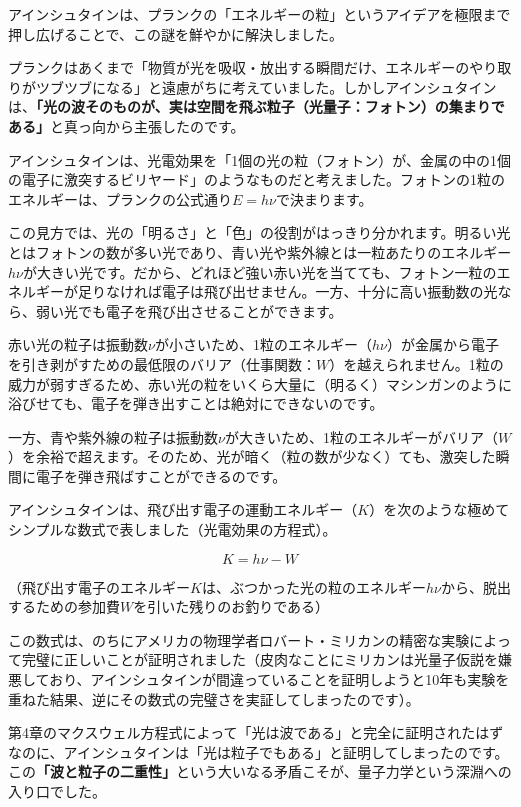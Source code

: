 アインシュタインは、プランクの「エネルギーの粒」というアイデアを極限まで押し広げることで、この謎を鮮やかに解決しました。

プランクはあくまで「物質が光を吸収・放出する瞬間だけ、エネルギーのやり取りがツブツブになる」と遠慮がちに考えていました。しかしアインシュタインは、\textbf{「光の波そのものが、実は空間を飛ぶ粒子（光量子：フォトン）の集まりである」}と真っ向から主張したのです。

アインシュタインは、光電効果を「1個の光の粒（フォトン）が、金属の中の1個の電子に激突するビリヤード」のようなものだと考えました。フォトンの1粒のエネルギーは、プランクの公式通り\(E = h\nu\)で決まります。

この見方では、光の「明るさ」と「色」の役割がはっきり分かれます。明るい光とはフォトンの数が多い光であり、青い光や紫外線とは一粒あたりのエネルギー\(h\nu\)が大きい光です。だから、どれほど強い赤い光を当てても、フォトン一粒のエネルギーが足りなければ電子は飛び出せません。一方、十分に高い振動数の光なら、弱い光でも電子を飛び出させることができます。

赤い光の粒子は振動数\(\nu\)が小さいため、1粒のエネルギー（\(h\nu\)）が金属から電子を引き剥がすための最低限のバリア（仕事関数：\(W\)）を越えられません。1粒の威力が弱すぎるため、赤い光の粒をいくら大量に（明るく）マシンガンのように浴びせても、電子を弾き出すことは絶対にできないのです。

一方、青や紫外線の粒子は振動数\(\nu\)が大きいため、1粒のエネルギーがバリア（\(W\)）を余裕で超えます。そのため、光が暗く（粒の数が少なく）ても、激突した瞬間に電子を弾き飛ばすことができるのです。

アインシュタインは、飛び出す電子の運動エネルギー（\(K\)）を次のような極めてシンプルな数式で表しました（光電効果の方程式）。

\[K = h\nu - W\]

（飛び出す電子のエネルギー\(K\)は、ぶつかった光の粒のエネルギー\(h\nu\)から、脱出するための参加費\(W\)を引いた残りのお釣りである）

この数式は、のちにアメリカの物理学者ロバート・ミリカンの精密な実験によって完璧に正しいことが証明されました（皮肉なことにミリカンは光量子仮説を嫌悪しており、アインシュタインが間違っていることを証明しようと10年も実験を重ねた結果、逆にその数式の完璧さを実証してしまったのです）。

第4章のマクスウェル方程式によって「光は波である」と完全に証明されたはずなのに、アインシュタインは「光は粒子でもある」と証明してしまったのです。この\textbf{「波と粒子の二重性」}という大いなる矛盾こそが、量子力学という深淵への入り口でした。

